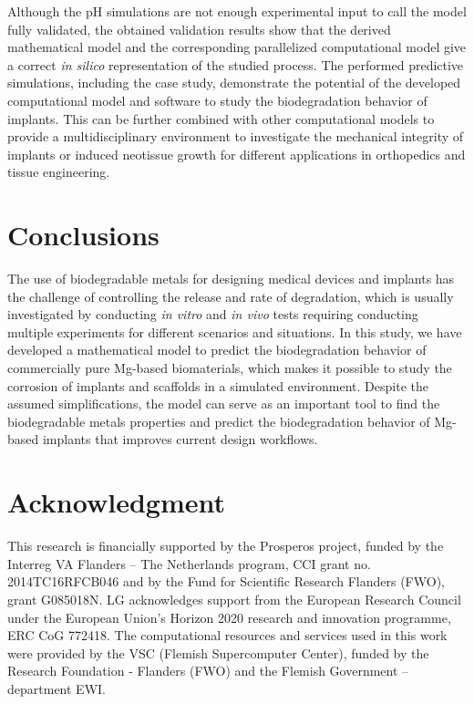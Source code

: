 Although the pH simulations are not enough experimental input to call the model fully validated, the obtained validation results show that the derived mathematical model and the corresponding parallelized computational model give a correct \textit{in silico} representation of the studied process. The performed predictive simulations, including the case study, demonstrate the potential of the developed computational model and software to study the biodegradation behavior of implants. This can be further combined with other computational models to provide a multidisciplinary environment to investigate the mechanical integrity of implants or induced neotissue growth for different applications in orthopedics and tissue engineering.

\section{Conclusions}

The use of biodegradable metals for designing medical devices and implants has the challenge of controlling the release and rate of degradation, which is usually investigated by conducting \textit{in vitro} and \textit{in vivo} tests requiring conducting multiple experiments for different scenarios and situations. In this study, we have developed a mathematical model to predict the biodegradation behavior of commercially pure Mg-based biomaterials, which makes it possible to study the corrosion of implants and scaffolds in a simulated environment. Despite the assumed simplifications, the model can serve as an important tool to find the biodegradable metals properties and predict the biodegradation behavior of Mg-based implants that improves current design workflows.


\section*{Acknowledgment}

This research is financially supported by the Prosperos project, funded by the Interreg VA Flanders – The Netherlands program, CCI grant no. 2014TC16RFCB046 and by the Fund for Scientific Research Flanders (FWO), grant G085018N. LG acknowledges support from the European Research Council under the European Union's Horizon 2020 research and innovation programme, ERC CoG 772418. The computational resources and services used in this work were provided by the VSC (Flemish Supercomputer Center), funded by the Research Foundation - Flanders (FWO) and the Flemish Government – department EWI.


\cleardoublepage

